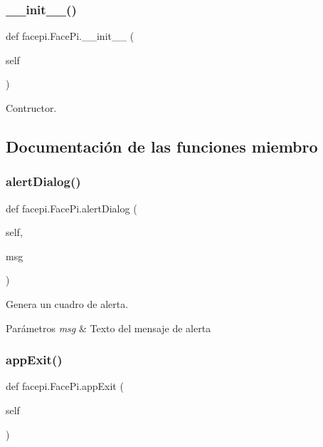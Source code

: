 \subsubsection{\texorpdfstring{\+\_\+\+\_\+init\+\_\+\+\_\+()}{\_\_init\_\_()}}
{\footnotesize\ttfamily def facepi.\+Face\+Pi.\+\_\+\+\_\+init\+\_\+\+\_\+ (\begin{DoxyParamCaption}\item[{}]{self }\end{DoxyParamCaption})}



Contructor. 



\subsection{Documentación de las funciones miembro}
\mbox{\label{classfacepi_1_1_face_pi_a32fcd9ee614d028b3722a0a18f07d03d}} 
\subsubsection{\texorpdfstring{alert\+Dialog()}{alertDialog()}}
{\footnotesize\ttfamily def facepi.\+Face\+Pi.\+alert\+Dialog (\begin{DoxyParamCaption}\item[{}]{self,  }\item[{}]{msg }\end{DoxyParamCaption})}



Genera un cuadro de alerta. 


\begin{DoxyParams}{Parámetros}
{\em msg} & Texto del mensaje de alerta \\
\hline
\end{DoxyParams}
\mbox{\label{classfacepi_1_1_face_pi_a69e8a3b9b7df0e5b6fc00233debe46a7}} 
\subsubsection{\texorpdfstring{app\+Exit()}{appExit()}}
{\footnotesize\ttfamily def facepi.\+Face\+Pi.\+app\+Exit (\begin{DoxyParamCaption}\item[{}]{self }\end{DoxyParamCaption})}



